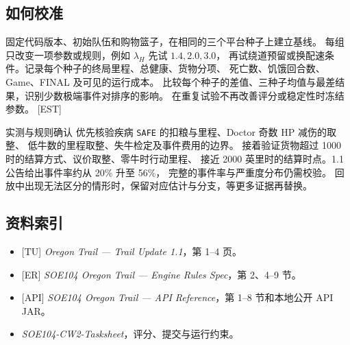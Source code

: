 \documentclass[UTF8,11pt,a4paper]{ctexart}
\newcommand{\src}[1]{\textup{\small\textcolor{muted}{[#1]}}}
\newcommand{\api}[1]{\texttt{#1}}
\begin{document}
\subsection{如何校准}

固定代码版本、初始队伍和购物篮子，在相同的三个平台种子上建立基线。
每组只改变一项参数或规则，例如 $\lambda_H$ 先试 $1.4,2.0,3.0$，
再试绕道预留或换配速条件。记录每个种子的终局里程、总健康、货物分项、
死亡数、饥饿回合数、Game、FINAL 及可见的运行成本。
比较每个种子的差值、三种子均值与最差结果，识别少数极端事件对排序的影响。
在重复试验不再改善评分或稳定性时冻结参数。 \src{EST}

\begin{warnbox}{实测与规则确认}
优先核验疾病 \api{SAFE} 的扣粮与里程、Doctor 奇数 HP 减伤的取整、
低牛数的里程取整、失牛检定及事件费用的边界。
接着验证货物超过 1000 时的结算方式、议价取整、零牛时行动里程、
接近 2000 英里时的结算时点。1.1 公告给出事件率约从 20\% 升至 56\%，
完整的事件率与严重度分布仍需校验。
回放中出现无法区分的情形时，保留对应估计与分支，等更多证据再替换。
\end{warnbox}

\subsection{资料索引}

\begin{itemize}
  \item \src{TU} \emph{Oregon Trail --- Trail Update 1.1}，第 1--4 页。
  \item \src{ER} \emph{SOE104 Oregon Trail --- Engine Rules Spec}，第 2、4--9 节。
  \item \src{API} \emph{SOE104 Oregon Trail --- API Reference}，第 1--8 节和本地公开 API JAR。
  \item \emph{SOE104-CW2-Tasksheet}，评分、提交与运行约束。
\end{itemize}
\end{document}
